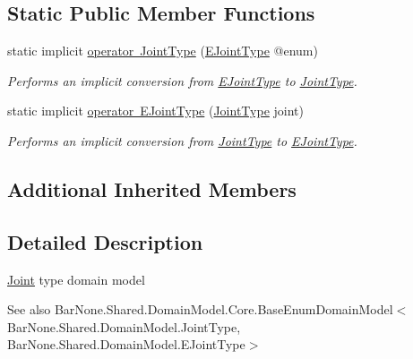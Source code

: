 \subsection*{Static Public Member Functions}
\begin{DoxyCompactItemize}
\item 
static implicit \mbox{\hyperlink{class_bar_none_1_1_shared_1_1_domain_model_1_1_joint_type_a3b4b62c23008dfbd9e51f5080ac945c5}{operator Joint\+Type}} (\mbox{\hyperlink{namespace_bar_none_1_1_shared_1_1_domain_model_a1aeba40858ef83a78921f013cdabb369}{E\+Joint\+Type}} @enum)
\begin{DoxyCompactList}\small\item\em Performs an implicit conversion from \mbox{\hyperlink{namespace_bar_none_1_1_shared_1_1_domain_model_a1aeba40858ef83a78921f013cdabb369}{E\+Joint\+Type}} to \mbox{\hyperlink{class_bar_none_1_1_shared_1_1_domain_model_1_1_joint_type}{Joint\+Type}}. \end{DoxyCompactList}\item 
static implicit \mbox{\hyperlink{class_bar_none_1_1_shared_1_1_domain_model_1_1_joint_type_abcaf03f3c1cf173e72f102581775f321}{operator E\+Joint\+Type}} (\mbox{\hyperlink{class_bar_none_1_1_shared_1_1_domain_model_1_1_joint_type}{Joint\+Type}} joint)
\begin{DoxyCompactList}\small\item\em Performs an implicit conversion from \mbox{\hyperlink{class_bar_none_1_1_shared_1_1_domain_model_1_1_joint_type}{Joint\+Type}} to \mbox{\hyperlink{namespace_bar_none_1_1_shared_1_1_domain_model_a1aeba40858ef83a78921f013cdabb369}{E\+Joint\+Type}}. \end{DoxyCompactList}\end{DoxyCompactItemize}
\subsection*{Additional Inherited Members}


\subsection{Detailed Description}
\mbox{\hyperlink{class_bar_none_1_1_shared_1_1_domain_model_1_1_joint}{Joint}} type domain model 

\begin{DoxySeeAlso}{See also}
Bar\+None.\+Shared.\+Domain\+Model.\+Core.\+Base\+Enum\+Domain\+Model$<$\+Bar\+None.\+Shared.\+Domain\+Model.\+Joint\+Type, Bar\+None.\+Shared.\+Domain\+Model.\+E\+Joint\+Type$>$


\end{DoxySeeAlso}


